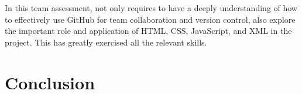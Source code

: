 \documentclass{article}
\begin{document}
In this team assessment, not only requires to have a deeply understanding of how to effectively use GitHub for team collaboration and version control,  also explore the important role and application of HTML, CSS, JavaScript, and XML in the project. This has greatly exercised all the relevant skills.

    
\section{Conclusion}




\end{document}
